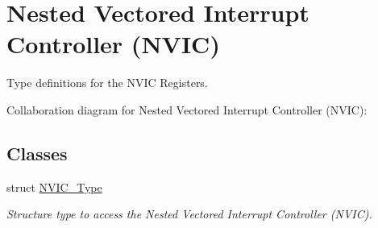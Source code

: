 \hypertarget{group___c_m_s_i_s___n_v_i_c}{}\section{Nested Vectored Interrupt Controller (N\+V\+IC)}
\label{group___c_m_s_i_s___n_v_i_c}


Type definitions for the N\+V\+IC Registers.  


Collaboration diagram for Nested Vectored Interrupt Controller (N\+V\+IC)\+:
\subsection*{Classes}
\begin{DoxyCompactItemize}
\item 
struct \hyperlink{struct_n_v_i_c___type}{N\+V\+I\+C\+\_\+\+Type}
\begin{DoxyCompactList}\small\item\em Structure type to access the Nested Vectored Interrupt Controller (N\+V\+IC). \end{DoxyCompactList}\end{DoxyCompactItemize}
